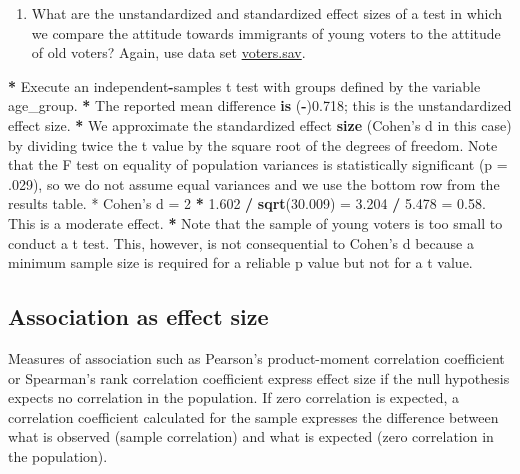 \documentclass[a4paper]{book}
\newenvironment{Shaded}{\begin{snugshade}}{\end{snugshade}}
\newcommand{\KeywordTok}[1]{\textcolor[rgb]{0,0,0}{\textbf{#1}}}
\newcommand{\DataTypeTok}[1]{\textcolor[rgb]{0,0,0}{#1}}
\newcommand{\DecValTok}[1]{\textcolor[rgb]{0.00,0.00,0.00}{#1}}
\newcommand{\FloatTok}[1]{\textcolor[rgb]{0.00,0.00,0.00}{#1}}
\newcommand{\StringTok}[1]{\textcolor[rgb]{0.00,0.00,0.00}{#1}}
\newcommand{\OperatorTok}[1]{\textcolor[rgb]{0.00,0.00,0.00}{\textbf{#1}}}
\newcommand{\NormalTok}[1]{#1}
\providecommand{\tightlist}{%
  \setlength{\itemsep}{0pt}\setlength{\parskip}{0pt}}
\theoremstyle{definition}
\theoremstyle{definition}
\theoremstyle{definition}
\theoremstyle{remark}
\begin{document}
\begin{enumerate}
\def\labelenumi{\arabic{enumi}.}
\setcounter{enumi}{2}
\tightlist
\item
  What are the unstandardized and standardized effect sizes of a test in
  which we compare the attitude towards immigrants of young voters to
  the attitude of old voters? Again, use data set
  \href{http://82.196.4.233:3838/data/voters.sav}{voters.sav}.
\end{enumerate}

\begin{Shaded}
\begin{Highlighting}[]
\OperatorTok{*}\StringTok{ }\NormalTok{Execute an independent}\OperatorTok{-}\NormalTok{samples t test with groups defined by the variable}
\NormalTok{age_group.}
\OperatorTok{*}\StringTok{ }\NormalTok{The reported mean difference }\KeywordTok{is}\NormalTok{ (}\OperatorTok{-}\NormalTok{)}\FloatTok{0.718}\NormalTok{; this is the unstandardized effect}
\NormalTok{size.}
\OperatorTok{*}\StringTok{ }\NormalTok{We approximate the standardized effect }\KeywordTok{size}\NormalTok{ (Cohen}\StringTok{'s d in this case) by}
\StringTok{dividing twice the t value by the square root of the degrees of freedom. Note}
\StringTok{that the F test on equality of population variances is statistically}
\StringTok{significant (p = .029), so we do not assume equal variances and we use the}
\StringTok{bottom row from the results table.}
\StringTok{* Cohen'}\NormalTok{s }\DataTypeTok{d =} \DecValTok{2} \OperatorTok{*}\StringTok{ }\FloatTok{1.602} \OperatorTok{/}\StringTok{ }\KeywordTok{sqrt}\NormalTok{(}\FloatTok{30.009}\NormalTok{) =}\StringTok{ }\FloatTok{3.204} \OperatorTok{/}\StringTok{ }\FloatTok{5.478}\NormalTok{ =}\StringTok{ }\FloatTok{0.58}\NormalTok{. This is a}
\NormalTok{moderate effect.}
\OperatorTok{*}\StringTok{ }\NormalTok{Note that the sample of young voters is too small to conduct a t test. This,}
\NormalTok{however, is not consequential to Cohen}\StringTok{'s d because a minimum sample size is}
\StringTok{required for a reliable p value but not for a t value.}
\end{Highlighting}
\end{Shaded}

\subsection{Association as effect size}\label{assoc-size}

Measures of association such as Pearson's product-moment correlation
coefficient or Spearman's rank correlation coefficient express effect
size if the null hypothesis expects no correlation in the population. If
zero correlation is expected, a correlation coefficient calculated for
the sample expresses the difference between what is observed (sample
correlation) and what is expected (zero correlation in the population).
\end{document}
